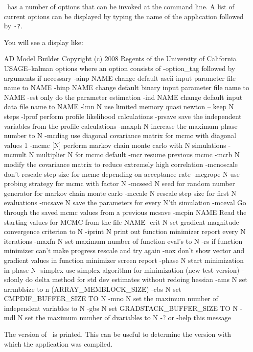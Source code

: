 %
%

\ADM\ has a number of options that can be invoked at the command line.
A list of current options can be displayed by typing the name of the application followed by \texttt{-?}. 

\medskip

You will see a display like:
\begin{code}
 AD Model Builder Copyright (c) 2008 Regents of the University of California
 USAGE--kalman options
 where an option consists of -option_tag followed by arguments if necessary
 -ainp NAME      change default ascii input parameter file name to NAME
 -binp NAME      change default binary input parameter file name to NAME
 -est            only do the parameter estimation
 -ind NAME       change default input data file name to NAME
 -lmn N          use limited memory quasi newton -- keep N steps
 -lprof          perform profile likelihood calculations
 -prsave         save the independent variables from the profile calculations
 -maxph N        increase the maximum phase number to N
 -mcdiag         use diagonal covariance matrix for mcmc with diagonal values 1
 -mcmc [N]       perform markov chain monte carlo with N simulations
 -mcmult N       multiplier N for mcmc default
 -mcr            resume previous mcmc
 -mcrb N         modify the covariance matrix to reduce extremely high correlation      
 -mcnoscale      don't rescale step size for mcmc depending on acceptance rate
 -mcgrope N      use probing strategy for mcmc with factor N
 -mcseed N       seed for random number generator for markov chain monte carlo
 -mccale N       rescale step size for first N evaluations
 -mcsave N       save the parameters for every N'th simulation
 -mceval         Go through the saved mcmc values from a previous mcsave
 -mcpin NAME      Read the starting values for MCMC from the file NAME
 -crit N         set gradient magnitude convergence criterion to N
 -iprint N       print out function minimizer report every N iterations
 -maxfn N        set maximum number of function eval's to N
 -rs             if function minimizer can't make progress rescale and try again
 -nox            don't show vector and gradient values in function minimizer screen
                 report
 -phase N        start minimization in phase N
 -simplex        use simplex algorithm for minimization (new test version)
 -sdonly         do delta method for std dev estimates without redoing hessian
 -ams N          set arrmblsize to n (ARRAY_MEMBLOCK_SIZE) 
 -cbs N          set CMPDIF_BUFFER_SIZE TO N 
 -mno N          set the maximum number of independent variables to N
 -gbs N          set GRADSTACK_BUFFER_SIZE TO N 
 -mdl N          set the maximum number of dvariables to N
 -? or -help     this message
\end{code}
The version of \ADM\ is printed. This can be useful to determine
the version with which the application was compiled.

